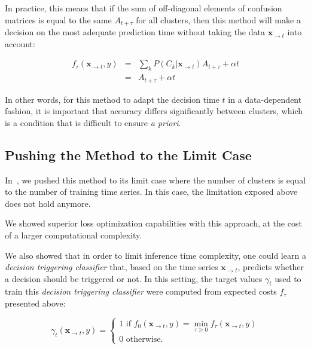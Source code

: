 In practice, this means that if the sum of off-diagonal elements of confusion
matrices is equal to the same $A_{t+\tau}$ for all clusters, then this method
will make a decision on the most adequate prediction time without taking the
data $\mathbf{x}_{\rightarrow t}$ into account:

\begin{eqnarray}
    f_\tau(\mathbf{x}_{\rightarrow t}, y) &=&
        \sum_k P(C_k | \mathbf{x}_{\rightarrow t})
        A_{t+\tau}
        + \alpha t \\
     &=&
        A_{t+\tau} + \alpha t
\end{eqnarray}

In other words, for this method to adapt the decision time $t$ in a
data-dependent fashion, it is important that accuracy differs
significantly between clusters, which is a condition that is difficult to ensure
\emph{a priori}.

\subsection{Pushing the Method to the Limit Case}

In~\cite{tavenard:halshs-01339007}, we pushed this method to its limit case
where the number of clusters is equal to the number of training time series.
In this case, the limitation exposed above does not hold anymore.

We showed superior loss optimization capabilities with this approach, at the
cost of a larger computational complexity.

We also showed that in order to limit inference time complexity, one could
learn a \emph{decision triggering classifier} that, based on the time series
$\mathbf{x}_{\rightarrow t}$, predicts whether a decision should be triggered
or not.
In this setting, the target values $\gamma_t$ used to train this
\emph{decision triggering classifier}
were computed from expected costs $f_\tau$ presented above:

\begin{equation}
    \gamma_t(\mathbf{x}_{\rightarrow t}, y) = \left\{
        \begin{array}{l}
            1 \text{ if } f_{0}(\mathbf{x}_{\rightarrow t}, y) =
                \min_{\tau \geq 0} f_{\tau}(\mathbf{x}_{\rightarrow t}, y) \\
            0 \text{ otherwise. }
        \end{array} \right.
\end{equation}

